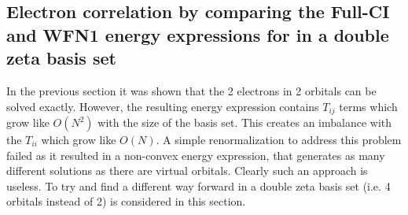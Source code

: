 \documentclass[pra,nofootinbib]{revtex4-1}
\begin{document}
\subsection{Electron correlation by comparing the Full-CI and WFN1 energy expressions for 
            in a double zeta basis set}

In the previous section it was shown that the 2 electrons in 2 orbitals can be solved exactly.
However, the resulting energy expression contains $T_{ij}$ terms which grow like $O(N^2)$ with
the size of the basis set. This creates an imbalance with the $T_{ii}$ which grow like $O(N)$.
A simple renormalization to address this problem failed as it resulted in a non-convex energy
expression, that generates as many different solutions as there are virtual orbitals. Clearly
such an approach is useless. To try and find a different way forward  in a double zeta
basis set (i.e. 4 orbitals instead of 2) is considered in this section.
\end{document}
